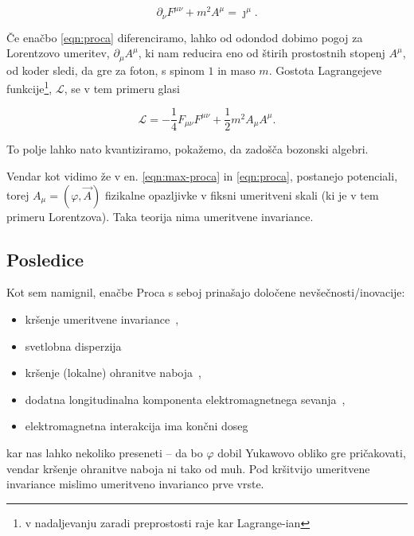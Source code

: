 \documentclass[a4paper, twocolumn, titlepage]{article}
\begin{document}
\begin{equation}
	\partial_\nu F^{\mu\nu} + m^2 A^\mu = \jmath^\mu.
	\label{eqn:proca}
\end{equation}

\v Ce ena\v cbo \eqref{eqn:proca} diferenciramo, lahko od odondod dobimo pogoj za Lorentzovo umeritev, $\partial_\mu
A^\mu$, ki nam reducira eno od \v stirih prostostnih stopenj $A^\mu$, od koder sledi, da gre za foton, s spinom $1$ in
maso $m$. Gostota Lagrangejeve funkcije\footnote{v nadaljevanju zaradi preprostosti raje kar Lagrange-ian}, $\mathcal{L}$,
se v tem primeru glasi

\begin{equation}
	\mathcal{L} = -\frac{1}{4}F_{\mu\nu}F^{\mu\nu} + \frac{1}{2}m^2A_\mu A^\mu.
	\label{eqn:proca-lagrangian}
\end{equation}

To polje lahko nato kvantiziramo, poka\v zemo, da zado\v s\v ca bozonski algebri.

Vendar kot vidimo \v ze v en. \eqref{eqn:max-proca} in \eqref{eqn:proca}, postanejo potenciali, torej $A_\mu =
(\varphi, \vec{A})$ fizikalne opazljivke v fiksni umeritveni skali (ki je v tem primeru Lorentzova). Taka teorija nima
umeritvene invariance.

\subsection{Posledice}

Kot sem namignil, ena\v cbe Proca s seboj prina\v sajo dolo\v cene nev\v se\v cnosti/inovacije:

\begin{itemize}
	\item{kr\v senje umeritvene invariance~\cite{nieto1,nieto2},}
	\item{svetlobna disperzija~\cite{nieto1,nieto2}}
	\item{kr\v senje (lokalne) ohranitve naboja~\cite{nieto2},}
	\item{dodatna longitudinalna komponenta elektromagnetnega sevanja~\cite{nieto1,nieto2},}
	\item{elektromagnetna interakcija ima kon\v cni doseg~\cite{nieto1,nieto2}}
\end{itemize}

kar nas lahko nekoliko preseneti -- da bo $\varphi$ dobil Yukawovo obliko gre pri\v cakovati, vendar kr\v senje ohranitve
naboja ni tako od muh. Pod kr\v sitvijo umeritvene invariance mislimo umeritveno invarianco prve vrste.
\end{document}
